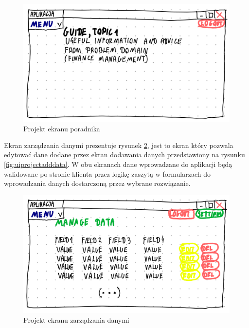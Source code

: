 \documentclass[a4paper,10pt, twoside]{report}
\begin{document}
\begin{large}
\begin{figure}[H]           %
    \centering
    \includegraphics[width=12cm]{figures/Righten_UI_sketch_guide.png}
    \caption{Projekt ekranu poradnika}
    \label{fig:uiprojectguide}
\end{figure}

{Ekran zarządzania danymi prezentuje rysunek \ref*{fig:uiprojectdatamanagement},
jest to ekran który pozwala edytować dane dodane przez ekran dodawania danych 
przedstawiony na rysunku \ref*{fig:uiprojectadddata}. W obu ekranach dane 
wprowadzane do aplikacji będą walidowane po stronie klienta przez logikę zaszytą
 w formularzach do wprowadzania danych dostarczoną przez wybrane rozwiązanie.}

\begin{figure}[H]           %
    \centering
    \includegraphics[width=12cm]{figures/Righten_UI_sketch_datamanagement.png}
    \caption{Projekt ekranu zarządzania danymi}
    \label{fig:uiprojectdatamanagement}
\end{figure}


\end{large}
\end{document}
